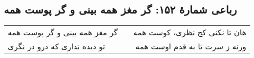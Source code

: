 \begin{center}
\section*{رباعی شمارهٔ ۱۵۲: گر مغز همه بینی و گر پوست همه}
\label{sec:152}
\begin{longtable}{l p{0.5cm} r}
گر مغز همه بینی و گر پوست همه
&&
هان تا نکنی کج نظری، کوست همه
\\
تو دیده نداری که درو در نگری
&&
ورنه ز سرت تا به قدم اوست همه
\\
\end{longtable}
\end{center}
